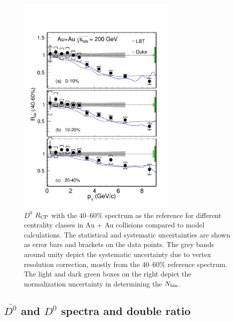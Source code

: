 \begin{figure}
\centering
\includegraphics[width=0.68\textwidth]{figure/Run14_D0HFT/D0_Rcp22.pdf}
\caption{$D^{0}$ $R_{\rm CP}$ with the 40--60\% spectrum as the reference for different centrality classes in Au + Au collisions compared to model calculations. The statistical and systematic uncertainties are shown as error bars and brackets on the data points. The grey bands around unity depict the systematic uncertainty due to vertex resolution correction, mostly from the 40--60\% reference spectrum. The light and dark green boxes on the right depict the normalization uncertainty in determining the $N_{\rm bin}$.}
\label{D0_Rcp22} 
\end{figure}

\subsection{\label{D0barD0ratio} $\bar{D^{0}}$ and $D^{0}$ spectra and double ratio}

